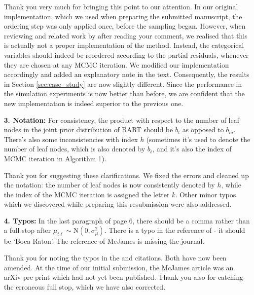 \documentclass{article}
\begin{document}
Thank you very much for bringing this point to our attention. In our original implementation, which we used when preparing the submitted manuscript, the ordering step was only applied once, before the sampling began. However, when reviewing \citet{breiman1984classification} and related work by \citet{wright2019splitting} after reading your comment, we realised that this is actually not a proper implementation of the method. Instead, the categorical variables should indeed be reordered according to the partial residuals, whenever they are chosen at any MCMC iteration. We modified our implementation accordingly and added an explanatory note in the text. Consequently, the results in Section \ref{sec:case_study} are now slightly different. Since the performance in the simulation experiments is now better than before, we are confident that the new implementation is indeed superior to the previous one.

\begin{mdframed}
 \textbf{3. Notation:} For consistency, the product with respect to the number of leaf nodes in the joint prior distribution of BART should be $b_{t}$ as opposed to $b_{m}$. There's also some inconsistencies with index $h$ (sometimes it's used to denote the number of leaf nodes, which is also denoted by $b_{t}$, and it's also the index of MCMC iteration in Algorithm 1).
\end{mdframed}
Thank you for suggesting these clarifications. We fixed the errors and cleaned up the notation: the number of  leaf nodes is now consistently denoted by $h$, while the index of the MCMC iteration is assigned the letter $k$. Other minor typos which we discovered while preparing this resubmission were also addressed. 

\begin{mdframed}
   \textbf{4. Typos:} In the last paragraph of page 6, there should be a comma rather than a full stop after $\mu_{t\ell} \sim \mbox{N}(0,\sigma_{\mu}^{2})$. There is a typo in the reference of \citet{baio2012bayesian} - it should be `Boca Raton'. The reference of McJames is missing the journal.
\end{mdframed}

Thank you for noting the typos in the \citet{baio2012bayesian} and \citet{mcjames2024bayesian} citations. Both have now been amended. At the time of our initial submission, the McJames article was an arXiv pre-print which had not yet been published. Thank you also for catching the erroneous full stop, which we have also corrected.
\end{document}

